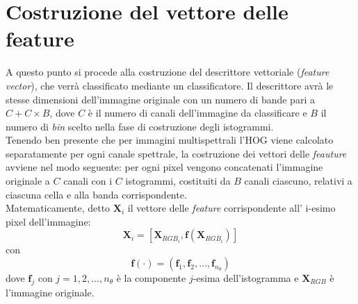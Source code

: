  \section{Costruzione del vettore delle feature}
A questo punto si procede alla costruzione del descrittore vettoriale (\emph{feature vector}), che verrà classificato mediante un classificatore. Il descrittore avrà le stesse dimensioni dell'immagine originale con un numero di bande pari a $C + C\times B$, dove $C$ è il numero di canali dell'immagine da classificare e $B$ il numero di \emph{bin} scelto nella fase di costruzione degli istogrammi.\\
Tenendo ben presente che per immagini multispettrali l'HOG viene calcolato separatamente per ogni canale spettrale, la costruzione dei vettori delle \emph{feauture} avviene nel modo seguente: per ogni pixel vengono concatenati l'immagine originale a $C$ canali con i $C$ istogrammi, costituiti da $B$ canali ciascuno, relativi a ciascuna cella e alla banda corrispondente.\\
Matematicamente, detto $\textbf{X}_{i}$ il vettore delle \emph{feature} corrispondente all' i-esimo pixel dell'immagine:
\begin{equation}
\label{eq:feature_vector}
\textbf{X}_{i}=\left[\textbf{X}_{RGB_{i}}, \textbf{f}(\textbf{X}_{RGB_{i}})\right]
\end{equation}
con \begin{equation}
\label{eq:}
\mathbf{f}(\cdot)=(\mathbf{f}_1,\mathbf{f}_2,\ldots,\mathbf{f}_{n_\theta})
\end{equation}
dove $\textbf{f}_j$ con $j=1,2,\ldots,n_\theta$ è la componente $j$-esima dell'istogramma e $\textbf{X}_{RGB}$ è l'immagine originale.
\\
